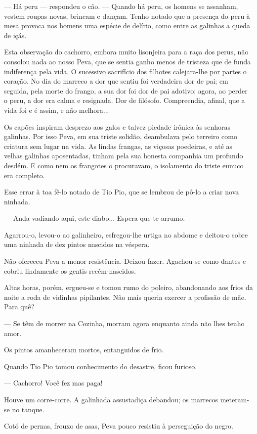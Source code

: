 --- Há peru --- respondeu o cão. --- Quando há peru, os homens se
assanham, vestem roupas novas, brincam e dançam. Tenho notado que a
presença do peru à mesa provoca nos homens uma espécie de delírio, como
entre as galinhas a queda de içás.

Esta observação do cachorro, embora muito lisonjeira para a raça dos
perus, não consolou nada ao nosso Peva, que se sentia ganho menos de
tristeza que de funda indiferença pela vida. O sucessivo sacrifício dos
filhotes calejara-lhe por partes o coração. No dia do marreco a dor que
sentiu foi verdadeira dor de pai; em seguida, pela morte do frango, a
sua dor foi dor de pai adotivo; agora, ao perder o peru, a dor era calma
e resignada. Dor de filósofo. Compreendia, afinal, que a vida foi e é
assim, e não melhora...

Os capões inspiram desprezo aos galos e talvez piedade irônica às
senhoras galinhas. Por isso Peva, em sua triste solidão, deambulava pelo
terreiro como criatura sem lugar na vida. As lindas frangas, as viçosas
poedeiras, e até as velhas galinhas aposentadas, tinham pela sua honesta
companhia um profundo desdém. E como nem os frangotes o procuravam, o
isolamento do triste eunuco era completo.

Esse errar à toa fê-lo notado de Tio Pio, que se lembrou de pô-lo a
criar nova ninhada.

--- Anda vadiando aqui, este diabo... Espera que te arrumo.

Agarrou-o, levou-o ao galinheiro, esfregou-lhe urtiga no abdome e
deitou-o sobre uma ninhada de dez pintos nascidos na véspera.

Não ofereceu Peva a menor resistência. Deixou fazer. Agachou-se como
dantes e cobriu lindamente os gentis recém-nascidos.

Altas horas, porém, ergueu-se e tomou rumo do poleiro, abandonando aos
frios da noite a roda de vidinhas pipilantes. Não mais queria exercer a
profissão de mãe. Para quê?

--- Se têm de morrer na Cozinha, morram agora enquanto ainda não lhes
tenho amor.

Os pintos amanheceram mortos, entanguidos de frio.

Quando Tio Pio tomou conhecimento do desastre, ficou furioso.

--- Cachorro! Você fez mas paga!

Houve um corre-corre. A galinhada assustadiça debandou; os marrecos
meteram-se no tanque.

Cotó de pernas, frouxo de asas, Peva pouco resistiu à perseguição do
negro.

